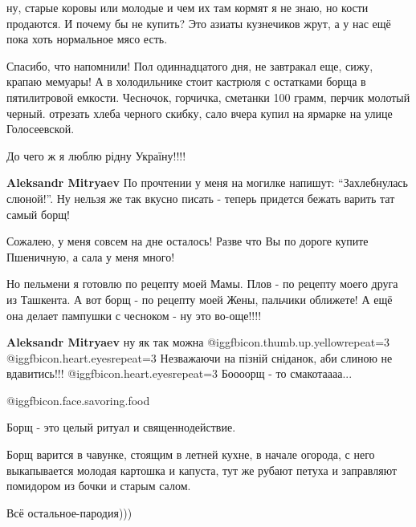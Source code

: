 \begin{itemize}
\begin{itemize}
\begin{itemize}
ну, старые коровы или молодые и чем их там кормят я не знаю, но кости
продаются. И почему бы не купить? Это азиаты кузнечиков жрут, а у нас ещё пока
хоть нормальное мясо есть.

\end{itemize} %

\end{itemize} %


Спасибо, что напомнили! Пол одиннадцатого дня, не завтракал еще, сижу, крапаю
мемуары! А в холодильнике стоит кастрюля с остатками борща в пятилитровой
емкости. Чесночок, горчичка, сметанки 100 грамм, перчик молотый черный.
отрезать хлеба черного скибку, сало вчера купил на ярмарке на улице
Голосеевской.

До чего ж я люблю рідну Україну!!!!

\begin{itemize} %
\textbf{Aleksandr Mitryaev} По прочтении у меня на могилке напишут: \enquote{Захлебнулась слюной!}. Ну нельзя же так вкусно писать - теперь придется бежать варить тат самый борщ!

Сожалею, у меня совсем на дне осталось! Разве что Вы по дороге купите Пшеничную, а сала у меня много!


Но пельмени я готовлю по рецепту моей Мамы. Плов - по рецепту моего друга из
Ташкента. А вот борщ - по рецепту моей Жены, пальчики оближете! А ещё она
делает пампушки с чесноком - ну это во-още!!!!


\textbf{Aleksandr Mitryaev} ну як так можна  @igg{fbicon.thumb.up.yellow}{repeat=3}  @igg{fbicon.heart.eyes}{repeat=3} 
Незважаючи на пізній сніданок, аби слиною не вдавитись!!!  @igg{fbicon.heart.eyes}{repeat=3} Боооорщ - то смакотаааа...
\end{itemize} %

 @igg{fbicon.face.savoring.food} 

Борщ - это целый ритуал и священнодействие.


Борщ варится в чавунке, стоящим в летней кухне, в начале огорода, с него
выкапывается молодая картошка и капуста, тут же рубают петуха и заправляют
помидором из бочки и старым салом.

Всё остальное-пародия)))


\end{itemize}
